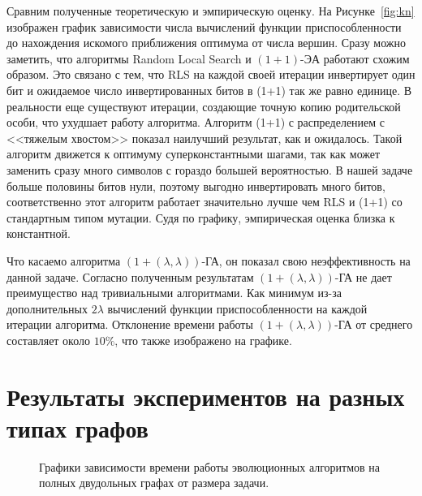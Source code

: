 \documentclass[times]{itmo-student-thesis}
\newcommand{\alglambdaf}{${(1 + (\lambda , \lambda))}$-ГА\xspace}
\newcommand{\oea}{\mbox{$(1 + 1)$-ЭА}\xspace}
\begin{document}
Сравним полученные теоретическую и эмпирическую оценку.
На Рисунке~\ref{fig:kn} изображен график зависимости числа вычислений функции приспособленности до нахождения искомого приближения оптимума от числа вершин.
Сразу можно заметить, что алгоритмы Random Local Search и \oea работают схожим образом.
Это связано с тем, что RLS на каждой своей итерации инвертирует один бит и ожидаемое число инвертированных битов в (1+1) так же равно единице. В реальности еще существуют итерации, создающие точную копию родительской особи, что ухудшает работу алгоритма.
Алгоритм (1+1) с распределением с <<тяжелым хвостом>> показал наилучший результат, как и ожидалось. Такой алгоритм движется к оптимуму суперконстантными шагами, так как может заменить сразу много символов с гораздо большей вероятностью. В нашей задаче больше половины битов нули, поэтому выгодно инвертировать много битов, соответственно этот алгоритм работает значительно лучше чем RLS и (1+1) со стандартным типом мутации. Судя по графику, эмпирическая оценка близка к константной.

Что касаемо алгоритма \alglambdaf, он показал свою неэффективность на данной задаче. Согласно полученным результатам \alglambdaf не дает преимущество над тривиальными алгоритмами. Как минимум из-за дополнительных $2\lambda$ вычислений функции приспособленности на каждой итерации алгоритма.
Отклонение времени работы \alglambdaf от среднего составляет около $10\%$, что также изображено на графике.

\section{Результаты экспериментов на разных типах графов}

\begin{figure}[t!]
\caption{Графики зависимости времени работы эволюционных алгоритмов на полных двудольных графах от размера задачи.}
\label{fig:knn}
\end{figure}
\end{document}
